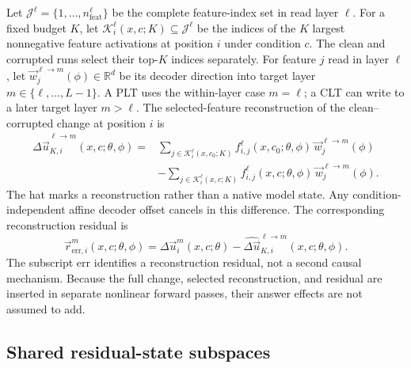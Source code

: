 Let $\mathcal{J}^{\ell}=\{1,\ldots,n_{\mathrm{feat}}^{\ell}\}$ be the complete feature-index set in read layer $\ell$. For a fixed budget $K$, let $\mathcal{K}_{i}^{\ell}(x,c;K)\subseteq\mathcal{J}^{\ell}$ be the indices of the $K$ largest nonnegative feature activations at position $i$ under condition $c$. The clean and corrupted runs select their top-$K$ indices separately. For feature $j$ read in layer $\ell$, let $\vec{w}_{j}^{\ell\rightarrow m}(\phi)\in\mathbb{R}^{d}$ be its decoder direction into target layer $m\in\{\ell,\ldots,L-1\}$. A PLT uses the within-layer case $m=\ell$; a CLT can write to a later target layer $m>\ell$. The selected-feature reconstruction of the clean--corrupted change at position $i$ is
\begin{equation}
\begin{aligned}
    \widehat{\Delta\vec{u}}_{K,i}^{\ell\rightarrow m}(x,c;\theta,\phi)
    ={}&\sum_{j\in\mathcal{K}_{i}^{\ell}(x,c_0;K)}
      f_{i,j}^{\ell}(x,c_0;\theta,\phi)\,\vec{w}_{j}^{\ell\rightarrow m}(\phi)\\
    &-\sum_{j\in\mathcal{K}_{i}^{\ell}(x,c;K)}
      f_{i,j}^{\ell}(x,c;\theta,\phi)\,\vec{w}_{j}^{\ell\rightarrow m}(\phi).
\end{aligned}
    \label{eq:sparse-reconstruction}
\end{equation}
The hat marks a reconstruction rather than a native model state. Any condition-independent affine decoder offset cancels in this difference. The corresponding reconstruction residual is
\begin{equation}
    \vec{r}_{\mathrm{err},i}^{m}(x,c;\theta,\phi)
    =\Delta\vec{u}_{i}^{m}(x,c;\theta)
     -\widehat{\Delta\vec{u}}_{K,i}^{\ell\rightarrow m}(x,c;\theta,\phi).
    \label{eq:reconstruction-residual}
\end{equation}
The subscript $\mathrm{err}$ identifies a reconstruction residual, not a second causal mechanism. Because the full change, selected reconstruction, and residual are inserted in separate nonlinear forward passes, their answer effects are not assumed to add.

\subsection{Shared residual-state subspaces}

